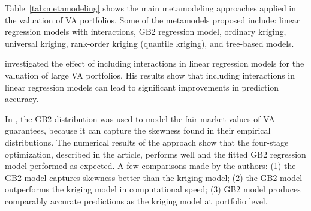 

Table~\ref{tab:metamodeling} shows the main metamodeling approaches applied in the valuation of VA portfolios. Some of the metamodels proposed include: linear regression models with interactions, GB2 regression model, ordinary kriging, universal kriging,  rank-order kriging (quantile kriging), and tree-based models.  

\cite{gan2018valuation} investigated the effect of including interactions in linear regression models for the valuation of large VA portfolios. His results show that including interactions in linear regression models can lead to significant improvements in prediction accuracy. 

In \cite{gan2017modeling}, the GB2 distribution was used to model the fair market values of VA guarantees, because it can capture the skewness found in their empirical distributions. 
The numerical results of the approach show that the four-stage optimization, described in the article, performs well and the fitted GB2 regression model performed as expected. A few comparisons made by the authors: (1) the GB2 model captures skewness better than the kriging model; (2) the GB2 model outperforms the kriging model in computational speed; (3) GB2 model produces comparably accurate predictions as the kriging model at portfolio level.

